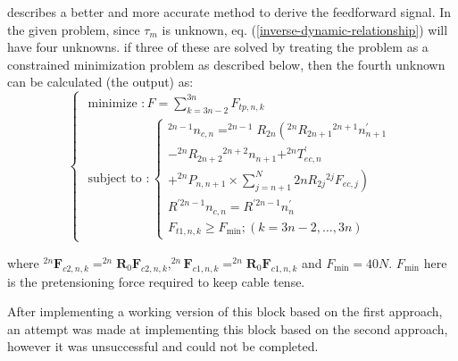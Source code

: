 \documentclass[a4paper,12pt]{report}
\begin{document}
\cite{RN30} describes a better and more accurate method to derive the feedforward signal. In the given problem, since $ \tau_m $ is unknown, eq. (\ref{inverse-dynamic-relationship}) will have four unknowns. if three of these are solved by treating the problem as a constrained minimization problem as described below, then the fourth unknown can be calculated (the output) as:
\begin{equation}
\left\{\begin{array}{l}
\text { minimize }: F=\sum_{k=3 n-2}^{3 n} F_{t p, n, k} \\
\text { subject to }:\left\{\begin{array}{l}
^{2 n-1} n_{c, n}=^{2 n-1} R_{2 n}\left(^{2 n} R_{2 n+1}{}^{2 n+1} n_{n+1}^{\prime}\right. \\
-^{2 n} R_{2 n+2}{}^{2 n+2} n_{n+1}+^{2 n} T_{e c, n}^{\prime} \\
\left.+^{2 n} P_{n, n+1} \times \sum_{j=n+1}^{N} 2 n R_{2 j}{}^{2 j} F_{e c, j}\right) \\
R^{\prime 2 n-1} n_{c, n}=R^{\prime 2 n-1} n_{n}^{\prime} \\
F_{t 1, n, k} \geq F_{\min } ;(k=3 n-2, \ldots, 3 n)
\end{array}\right.
\end{array}\right.
\label{minimization}
\end{equation}   

where $^{2 n} \boldsymbol{F}_{c 2, n, k}=^{2 n} \boldsymbol{R}_{0} \boldsymbol{F}_{c 2, n, k},^{2 n} \boldsymbol{F}_{c 1, n, k}=^{2 n} \boldsymbol{R}_{0} \boldsymbol{F}_{c 1, n, k}$ and $ F_{\min } = 40N$. $ F_{\min }$ here is the pretensioning force required to keep cable tense.

After implementing a working version of this block based on the first approach, an attempt was made at implementing this block based on the second approach, however it was unsuccessful and could not be completed.
\end{document}
